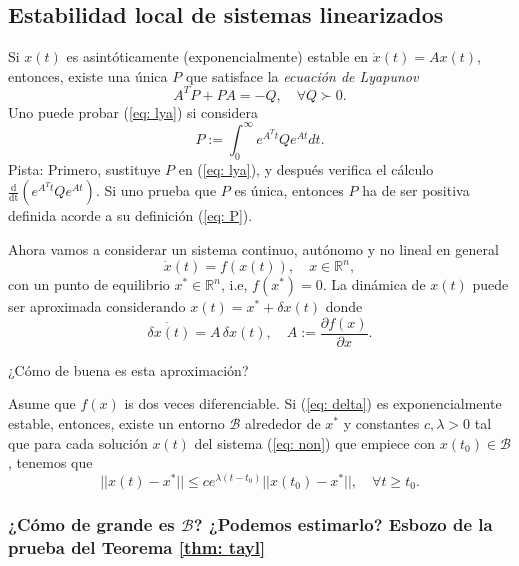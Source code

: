 \subsection{Estabilidad local de sistemas linearizados}
Si $x(t)$ es asintóticamente (exponencialmente) estable en $\dot x(t) = Ax(t)$, entonces, existe una única $P$ que satisface la \emph{ecuación de Lyapunov}
\begin{equation}
A^TP + PA = -Q, \quad \forall Q \succ 0.
	\label{eq: lya}
\end{equation}
Uno puede probar (\ref{eq: lya}) si considera
\begin{equation}
	P:= \int_0^\infty e^{A^Tt}Qe^{At}dt.
	\label{eq: P}
\end{equation}
Pista: Primero, sustituye $P$ en (\ref{eq: lya}), y después verifica el cálculo  $\frac{\mathrm{d}}{\mathrm{dt}}\left(e^{A^Tt}Qe^{At}\right)$. Si uno prueba que $P$ es única, entonces $P$ ha de ser positiva definida acorde a su definición (\ref{eq: P}).

Ahora vamos a considerar un sistema continuo, autónomo y no lineal en general
\begin{equation}
	\dot x(t) = f(x(t)), \quad x\in\mathbb{R}^n,
	\label{eq: non}
\end{equation}
con un punto de equilibrio $x^*\in\mathbb{R}^n$, i.e, $f(x^*) = 0$. La dinámica de $x(t)$ puede ser aproximada considerando $x(t) = x^* + \delta x(t)$ donde 
\begin{equation}
	\dot{\delta x(t)} = A\,\delta x(t), \quad A:=\frac{\partial f(x)}{\partial x}.
	\label{eq: delta}
\end{equation}

¿Cómo de buena es esta aproximación?

\begin{theorem}
	\label{thm: tayl}
	Asume que $f(x)$ is dos veces diferenciable. Si (\ref{eq: delta}) es exponencialmente estable, entonces, existe un entorno $\mathcal{B}$ alrededor de $x^*$ y constantes $c, \lambda > 0$ tal que para cada solución $x(t)$ del sistema (\ref{eq: non}) que empiece con $x(t_0)\in\mathcal{B}$, tenemos que
	\begin{equation}
	||x(t) - x^*|| \leq ce^{\lambda(t-t_0)} ||x(t_0) - x^*||, \quad \forall t\geq t_0.
	\end{equation}
\end{theorem}

\subsubsection{¿Cómo de grande es $\mathcal{B}$? ¿Podemos estimarlo? Esbozo de la prueba del Teorema \ref{thm: tayl}}

